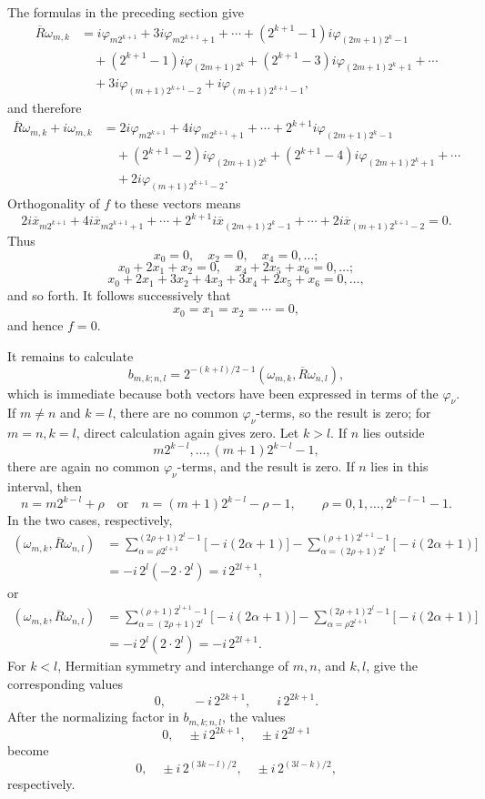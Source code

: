 ﻿\documentclass[paper=b5,fontsize=13pt,bookmarkpackage=false,twoside]{scrartcl}
\begin{document}
The formulas in the preceding section give
\begin{align*}
 \overline R\omega_{m,k}
 &=i\varphi_{m2^{k+1}}
   +3i\varphi_{m2^{k+1}+1}
   +\cdots+(2^{k+1}-1)i\varphi_{(2m+1)2^k-1}\\
 &\quad +(2^{k+1}-1)i\varphi_{(2m+1)2^k}
   +(2^{k+1}-3)i\varphi_{(2m+1)2^k+1}
   +\cdots\\
 &\quad +3i\varphi_{(m+1)2^{k+1}-2}
   +i\varphi_{(m+1)2^{k+1}-1},
\end{align*}
and therefore
\begin{align*}
 \overline R\omega_{m,k}+i\omega_{m,k}
 &=2i\varphi_{m2^{k+1}}
   +4i\varphi_{m2^{k+1}+1}
   +\cdots+2^{k+1}i\varphi_{(2m+1)2^k-1}\\
 &\quad +(2^{k+1}-2)i\varphi_{(2m+1)2^k}
   +(2^{k+1}-4)i\varphi_{(2m+1)2^k+1}
   +\cdots\\
 &\quad +2i\varphi_{(m+1)2^{k+1}-2}.
\end{align*}
Orthogonality of \(f\) to these vectors means
\[
  2i\overline{x}_{m2^{k+1}}
  +4i\overline{x}_{m2^{k+1}+1}
  +\cdots
  +2^{k+1}i\overline{x}_{(2m+1)2^k-1}
  +\cdots
  +2i\overline{x}_{(m+1)2^{k+1}-2}=0.
\]
Thus
\[
  x_0=0,\quad x_2=0,\quad x_4=0,\ldots;
\]
\[
  x_0+2x_1+x_2=0,\quad
  x_4+2x_5+x_6=0,\ldots;
\]
\[
  x_0+2x_1+3x_2+4x_3+3x_4+2x_5+x_6=0,\ldots,
\]
and so forth.  It follows successively that
\[
  x_0=x_1=x_2=\cdots=0,
\]
and hence \(f=0\).

It remains to calculate
\[
  b_{m,k;n,l}
  =2^{-(k+l)/2-1}(\omega_{m,k},\overline R\omega_{n,l}),
\]
which is immediate because both vectors have been expressed in terms
of the \(\varphi_\nu\).  If \(m\neq n\) and \(k=l\), there are no common
\(\varphi_\nu\)-terms, so the result is zero; for \(m=n,k=l\), direct
calculation again gives zero.  Let \(k>l\).  If \(n\) lies outside
\[
  m2^{k-l},\ldots,(m+1)2^{k-l}-1,
\]
there are again no common \(\varphi_\nu\)-terms, and the result is
zero.  If \(n\) lies in this interval, then
\[
  n=m2^{k-l}+\rho
  \quad\text{or}\quad
  n=(m+1)2^{k-l}-\rho-1,
  \qquad
  \rho=0,1,\ldots,2^{k-l-1}-1.
\]
In the two cases, respectively,
\begin{align*}
 (\omega_{m,k},\overline R\omega_{n,l})
 &=
 \sum_{\alpha=\rho2^{l+1}}^{(2\rho+1)2^l-1}
      \bigl[-i(2\alpha+1)\bigr]
 -\sum_{\alpha=(2\rho+1)2^l}^{(\rho+1)2^{l+1}-1}
      \bigl[-i(2\alpha+1)\bigr]\\
 &=-i\,2^l(-2\cdot2^l)=i\,2^{2l+1},
\end{align*}
or
\begin{align*}
 (\omega_{m,k},\overline R\omega_{n,l})
 &=
 \sum_{\alpha=(2\rho+1)2^l}^{(\rho+1)2^{l+1}-1}
      \bigl[-i(2\alpha+1)\bigr]
 -\sum_{\alpha=\rho2^{l+1}}^{(2\rho+1)2^l-1}
      \bigl[-i(2\alpha+1)\bigr]\\
 &=-i\,2^l(2\cdot2^l)=-i\,2^{2l+1}.
\end{align*}
For \(k<l\), Hermitian symmetry and interchange of \(m,n\), and
\(k,l\), give the corresponding values
\[
  0,\qquad -i\,2^{2k+1},\qquad i\,2^{2k+1}.
\]
After the normalizing factor in \(b_{m,k;n,l}\), the values
\[
  0,\quad\pm i\,2^{2k+1},\quad\pm i\,2^{2l+1}
\]
become
\[
  0,\quad
  \pm i\,2^{(3k-l)/2},\quad
  \pm i\,2^{(3l-k)/2},
\]
respectively.
\end{document}
